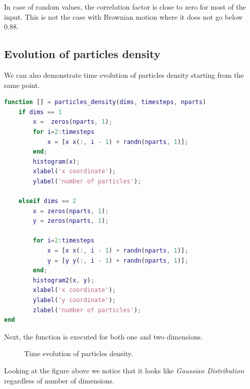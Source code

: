 \documentclass[12pt]{article}
\begin{document}
In case of random values, the correlation factor is close to zero for most of the input. This is not the case with Brownian motion where it does not go below 0.88.

\subsection{Evolution of particles density}

We can also demonstrate time evolution of particles density starting from the same point.

\begin{lstlisting}[language=Matlab, caption = {Source code for particles density}]
function [] = particles_density(dims, timesteps, nparts)
	if dims == 1
		x =  zeros(nparts, 1);
		for i=2:timesteps
			x = [x x(:, i - 1) + randn(nparts, 1)];
		end;
		histogram(x);
		xlabel('x coordinate');
		ylabel('number of particles');

	elseif dims == 2
		x = zeros(nparts, 1);
		y = zeros(nparts, 1);

		for i=2:timesteps
			x = [x x(:, i - 1) + randn(nparts, 1)];
			y = [y y(:, i - 1) + randn(nparts, 1)];
		end;
		histogram2(x, y);
		xlabel('x coordinate');
		ylabel('y coordinate');
		zlabel('number of particles');
end
\end{lstlisting}

Next, the function is executed for both one and two dimensions.

\begin{figure}[H]
	\centering
	\caption{Time evolution of particles density.}
\end{figure}

Looking at the figure above we notice that it looks like \textit{Gaussian Distribution} regardless of number of dimensions.
\end{document}
